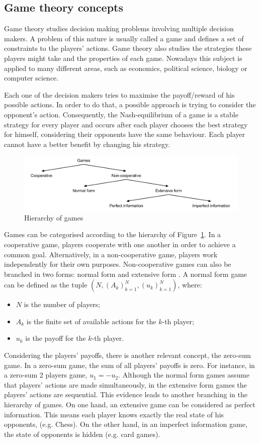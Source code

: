 \subsection{Game theory concepts}

Game theory studies decision making problems involving multiple decision makers.
A problem of this nature is usually called a game and defines a set of constraints to the players' actions.
Game theory also studies the strategies these players might take and the properties of each game.
Nowadays this subject is applied to many different areas, such as economics, political science, biology or computer science.

Each one of the decision makers tries to maximise the payoff/reward of his possible actions.
In order to do that, a possible approach is trying to consider the opponent's action.
Consequently, the Nash-equilibrium of a game is a stable strategy for every player and occurs after each player chooses the best strategy for himself, considering their opponents have the same behaviour.
Each player cannot have a better benefit by changing his strategy.

\begin{figure}
\centering
\includegraphics[width=1\textwidth]{./img/gamesHierarchy}
\caption{Hierarchy of games}
\label{fig:games}
\end{figure}

Games can be categorised according to the hierarchy of Figure~\ref{fig:games}.
In a cooperative game, players cooperate with one another in order to achieve a common goal.
Alternatively, in a non-cooperative game, players work independently for their own purposes.
Non-cooperative games can also be branched in two forms: normal form and extensive form \cite{Shoham2010}.
A normal form game can be defined as the tuple $(N,(A_k)_{k=1}^{N},(u_k)_{k=1}^{N})$, where:
\begin{itemize}
\item $N$ is the number of players;
\item $A_k$ is the finite set of available actions for the $k$-th player;
\item $u_k$ is the payoff for the $k$-th player.
\end{itemize}
Considering the players' payoffs, there is another relevant concept, the zero-sum game.
In a zero-sum game, the sum of all players' payoffs is zero.
For instance, in a zero-sum 2 players game, $u_1 = -u_2$.
Although the normal form games assume that players' actions are made simultaneously, in the extensive form games the players' actions are sequential.
This evidence leads to another branching in the hierarchy of games.
On one hand, an extensive game can be considered as perfect information.
This means each player knows exactly the real state of his opponents, (e.g. Chess).
On the other hand, in an imperfect information game, the state of opponents is hidden (e.g. card games).

